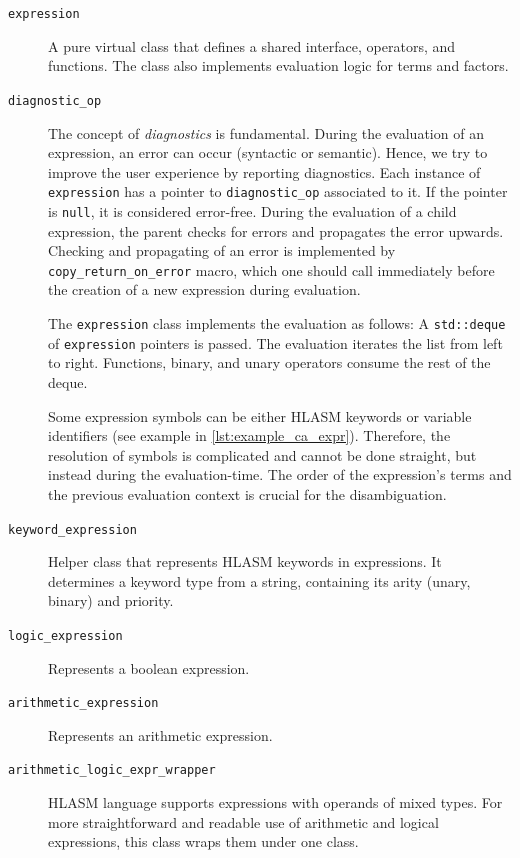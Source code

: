 \begin{description}
	\item[\texttt{expression}] A pure virtual class that defines a shared interface, operators, and functions. The class also implements evaluation logic for terms and factors.
	
	\item[\texttt{diagnostic\_op}] The concept of \emph{diagnostics} is fundamental. During the evaluation of an expression, an error can occur (syntactic or semantic). Hence, we try to improve the user experience by reporting diagnostics. Each instance of \texttt{expression} has a pointer to \texttt{diagnostic\_op} associated to it. If the pointer is \texttt{null}, it is considered error-free. During the evaluation of a child expression, the parent checks for errors and propagates the error upwards. Checking and propagating of an error is implemented by \texttt{copy\_return\_on\_error} macro, which one should call immediately before the creation of a new expression during evaluation.
	
	The \texttt{expression} class implements the evaluation as follows:
	A \texttt{std::deque} of \texttt{expression} pointers is passed. The evaluation iterates the list from left to right.  Functions, binary, and unary operators consume the rest of the deque.
	
	Some expression symbols can be either HLASM keywords or variable identifiers (see example in \cref{lst:example_ca_expr}). Therefore, the resolution of symbols is complicated and cannot be done straight, but instead during the evaluation-time. The order of the expression's terms and the previous evaluation context is crucial for the disambiguation. 
	
	\item[\texttt{keyword\_expression}] Helper class that represents HLASM keywords in expressions. It determines a keyword type from a string, containing its arity (unary, binary) and priority.
	
	\item[\texttt{logic\_expression}] Represents a boolean expression.
	
	\item[\texttt{arithmetic\_expression}] Represents an arithmetic expression.
	
	\item[\texttt{arithmetic\_logic\_expr\_wrapper}] HLASM language supports expressions with operands of mixed types. For more straightforward and readable use of arithmetic and logical expressions, this class wraps them under one class.
	

\end{description}
